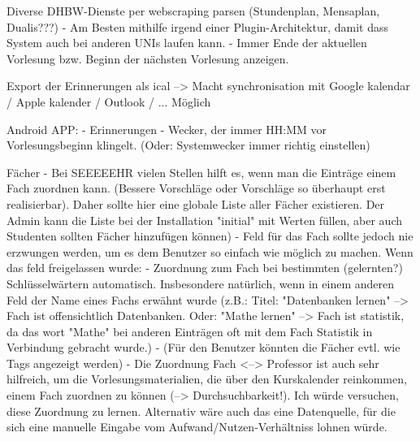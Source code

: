 Diverse DHBW-Dienste per webscraping parsen (Stundenplan, Mensaplan, Dualis???) - Am Besten mithilfe irgend einer Plugin-Architektur, damit dass System auch bei anderen UNIs laufen kann.
    - Immer Ende der aktuellen Vorlesung bzw. Beginn der nächsten Vorlesung anzeigen.


Export der Erinnerungen als ical --> Macht synchronisation mit Google kalendar / Apple kalender / Outlook / ... Möglich %

Android APP: %
    - Erinnerungen
    - Wecker, der immer HH:MM vor Vorlesungsbeginn klingelt. (Oder: Systemwecker immer richtig einstellen)

Fächer %
    - Bei SEEEEEHR vielen Stellen hilft es, wenn man die Einträge einem Fach zuordnen kann. (Bessere Vorschläge oder Vorschläge so überhaupt erst realisierbar). Daher sollte hier eine globale Liste aller Fächer existieren. Der Admin kann die Liste bei der Installation "initial" mit Werten füllen, aber auch Studenten sollten Fächer hinzufügen können)
    - Feld für das Fach sollte jedoch nie erzwungen werden, um es dem Benutzer so einfach wie möglich zu machen. Wenn das feld freigelassen wurde: 
    - Zuordnung zum Fach bei bestimmten (gelernten?) Schlüsselwärtern automatisch. Insbesondere natürlich, wenn in einem anderen Feld der Name eines Fachs erwähnt wurde (z.B.: Titel: "Datenbanken lernen" --> Fach ist offensichtlich Datenbanken. Oder: "Mathe lernen" --> Fach ist statistik, da das wort "Mathe" bei anderen Einträgen oft mit dem Fach Statistik in Verbindung gebracht wurde.)
    - (Für den Benutzer könnten die Fächer evtl. wie Tags angezeigt werden)
    - Die Zuordnung Fach <--> Professor ist auch sehr hilfreich, um die Vorlesungsmaterialien, die über den Kurskalender reinkommen, einem Fach zuordnen zu können (--> Durchsuchbarkeit!). Ich würde versuchen, diese Zuordnung zu lernen. Alternativ wäre auch das eine Datenquelle, für die sich eine manuelle Eingabe vom Aufwand/Nutzen-Verhältniss lohnen würde.

